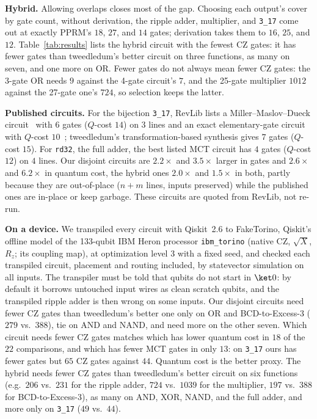 \documentclass[conference]{IEEEtran}
\theoremstyle{plain}
\begin{document}
\textbf{Hybrid.} Allowing overlaps closes most of the gap. Choosing each
output's cover by gate count, without derivation, the ripple adder, multiplier, and
\texttt{3\_17} come out at exactly PPRM's $18$, $27$, and $14$ gates;
derivation takes them to $16$, $25$, and $12$. Table~\ref{tab:results}
lists the hybrid circuit with the fewest CZ gates: it has fewer gates
than tweedledum's better circuit on three functions, as many on seven,
and one more on OR. Fewer gates do not always mean fewer CZ gates: the
3-gate OR needs $9$ against the 4-gate circuit's $7$, and the 25-gate
multiplier $1012$ against the 27-gate one's $724$, so selection keeps
the latter.

\textbf{Published circuits.} For the bijection \texttt{3\_17}, RevLib
lists a Miller--Maslov--Dueck circuit~\cite{miller2003} with $6$ gates
($Q$-cost $14$) on $3$ lines and an exact elementary-gate circuit with
$Q$-cost $10$~\cite{grosse2008}; tweedledum's transformation-based
synthesis gives $7$ gates ($Q$-cost $15$). For \texttt{rd32}, the full
adder, the best listed MCT circuit has $4$ gates ($Q$-cost $12$) on $4$
lines. Our disjoint circuits are $2.2\times$ and $3.5\times$ larger in
gates and $2.6\times$ and $6.2\times$ in quantum cost, the hybrid ones
$2.0\times$ and $1.5\times$ in both, partly because they are
out-of-place ($n+m$ lines, inputs preserved) while the published ones
are in-place or keep garbage. These circuits are quoted from RevLib,
not re-run.

\textbf{On a device.} We transpiled every circuit with Qiskit~2.6 to
FakeTorino, Qiskit's offline model of the 133-qubit IBM Heron processor
\texttt{ibm\_torino} (native CZ, $\sqrt{X}$, $R_z$; its coupling map),
at optimization level 3 with a fixed seed, and checked each transpiled
circuit, placement and routing included, by statevector simulation on
all inputs. The transpiler must be told that qubits do not start in
$\ket0$: by default it borrows untouched input wires as clean scratch
qubits, and the transpiled ripple adder is then wrong on some inputs.
Our disjoint circuits need fewer CZ gates than tweedledum's better one
only on OR and BCD-to-Excess-3 ($279$ vs.\ $388$), tie on AND and NAND,
and need more on the other seven. Which circuit needs fewer CZ gates
matches which has lower quantum cost in $18$ of the $22$ comparisons,
and which has fewer MCT gates in only $13$: on \texttt{3\_17} ours has
fewer gates but $65$ CZ gates against $44$. Quantum cost is the better
proxy. The hybrid needs fewer CZ gates than tweedledum's better circuit
on six functions (e.g.\ $206$ vs.\ $231$ for the ripple adder, $724$
vs.\ $1039$ for the multiplier, $197$ vs.\ $388$ for BCD-to-Excess-3),
as many on AND, XOR, NAND, and the full adder, and more only on
\texttt{3\_17} ($49$ vs.\ $44$).
\end{document}

